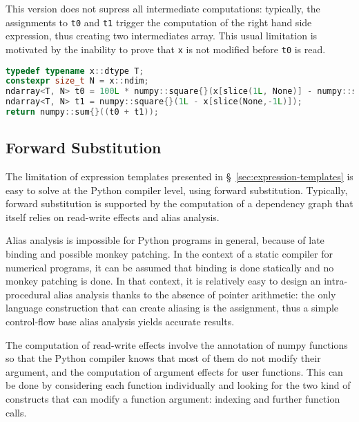 \documentclass[10pt, preprint]{sigplanconf}
\begin{document}
This version does not supress all intermediate computations: typically, the
assignments to \texttt{t0} and \texttt{t1} trigger the computation of the right
hand side expression, thus creating two intermediates array. This usual
limitation is motivated by the inability to prove that \texttt{x} is not
modified before \texttt{t0} is read.

\begin{lstlisting}[language=c++, caption={C++11 translated version of Python version for the rosenbrock kernel.}, label={lst:rosen-cxx}, breaklines=true]
typedef typename x::dtype T;
constexpr size_t N = x::ndim;
ndarray<T, N> t0 = 100L * numpy::square{}(x[slice(1L, None)] - numpy::square{}(x[slice(None,-1L)]));
ndarray<T, N> t1 = numpy::square{}(1L - x[slice(None,-1L)]);
return numpy::sum{}((t0 + t1));
\end{lstlisting}

\subsection{Forward Substitution}
\label{sec:fs}

The limitation of expression templates presented in
\S~\ref{sec:expression-templates} is easy to solve at the Python compiler
level, using forward substitution. Typically, forward substitution is
supported by the computation of a dependency graph that itself relies on
read-write effects and alias analysis.

Alias analysis is impossible for Python programs in general, because of late
binding and possible monkey patching. In the context of a static compiler for
numerical programs, it can be assumed that binding is done statically and no
monkey patching is done.  In that context, it is relatively easy to design an
intra-procedural alias analysis thanks to the absence of pointer arithmetic:
the only language construction that can create aliasing is the assignment, thus
a simple control-flow base alias analysis yields accurate results.

The computation of read-write effects involve the annotation of numpy functions
so that the Python compiler knows that most of them do not modify their
argument, and the computation of argument effects for user functions. This can
be done by considering each function individually and looking for the two kind
of constructs that can modify a function argument: indexing and further
function calls.
\end{document}
